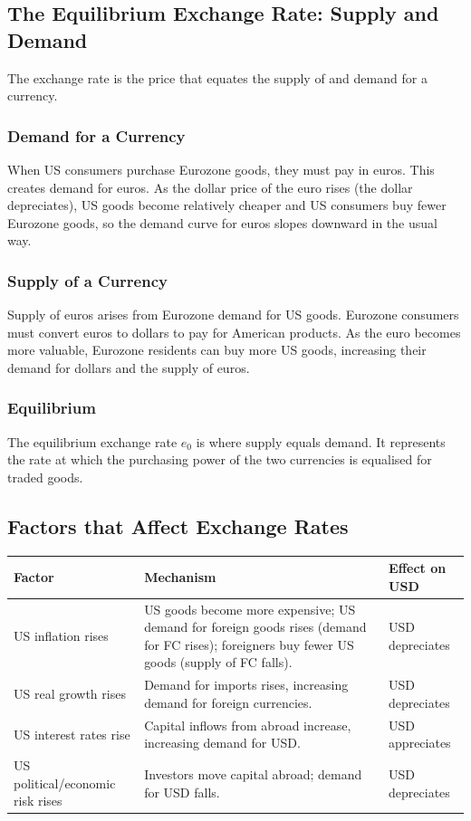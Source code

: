 \documentclass[11pt,a4paper]{article}
\begin{document}
\subsection{The Equilibrium Exchange Rate: Supply and Demand}

The exchange rate is the price that equates the supply of and demand for a currency.

\subsubsection{Demand for a Currency}

When US consumers purchase Eurozone goods, they must pay in euros. This creates demand for euros. As the dollar price of the euro rises (the dollar depreciates), US goods become relatively cheaper and US consumers buy fewer Eurozone goods, so the demand curve for euros slopes downward in the usual way.

\subsubsection{Supply of a Currency}

Supply of euros arises from Eurozone demand for US goods. Eurozone consumers must convert euros to dollars to pay for American products. As the euro becomes more valuable, Eurozone residents can buy more US goods, increasing their demand for dollars and the supply of euros.

\subsubsection{Equilibrium}

The equilibrium exchange rate $e_0$ is where supply equals demand. It represents the rate at which the purchasing power of the two currencies is equalised for traded goods.

\subsection{Factors that Affect Exchange Rates}

\begin{center}
\begin{tabular}{lp{6.5cm}l}
\toprule
\textbf{Factor} & \textbf{Mechanism} & \textbf{Effect on USD} \\
\midrule
US inflation rises & US goods become more expensive; US demand for foreign goods rises (demand for FC rises); foreigners buy fewer US goods (supply of FC falls). & USD depreciates \\
\addlinespace
US real growth rises & Demand for imports rises, increasing demand for foreign currencies. & USD depreciates \\
\addlinespace
US interest rates rise & Capital inflows from abroad increase, increasing demand for USD. & USD appreciates \\
\addlinespace
US political/economic risk rises & Investors move capital abroad; demand for USD falls. & USD depreciates \\
\bottomrule
\end{tabular}
\end{center}
\end{document}
